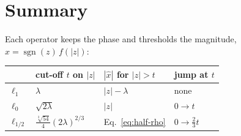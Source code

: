 \documentclass[11pt,a4paper]{article}
\theoremstyle{definition}
\DeclareMathOperator{\sgn}{sgn}
\begin{document}
\section{Summary}

Each operator keeps the phase and thresholds the magnitude, $\hat x = \sgn(z)\,f(|z|)$:
\begin{center}
\begin{tabular}{@{}llll@{}}
\toprule
 & cut-off $t$ on $|z|$ & $|\hat x|$ for $|z|>t$ & jump at $t$ \\
\midrule
$\ell_1$ & $\lambda$ & $|z|-\lambda$ & none \\
$\ell_0$ & $\sqrt{2\lambda}$ & $|z|$ & $0\to t$ \\
$\ell_{1/2}$ & $\tfrac{\sqrt[3]{54}}{4}(2\lambda)^{2/3}$ & Eq.~\eqref{eq:half-rho} & $0\to\tfrac23 t$ \\
\bottomrule
\end{tabular}
\end{center}
\end{document}

